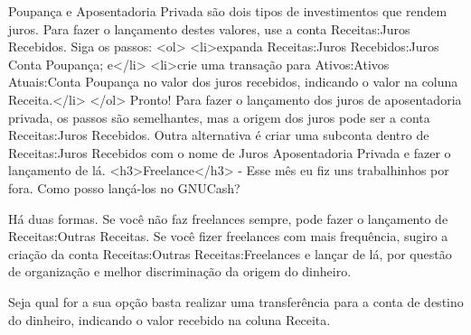 Poupança e Aposentadoria Privada são dois tipos de investimentos que rendem juros. Para fazer o lançamento destes valores, use a conta Receitas:Juros Recebidos. Siga os passos:
<ol>
    <li>expanda Receitas:Juros Recebidos:Juros Conta Poupança; e</li>
    <li>crie uma transação para Ativos:Ativos Atuais:Conta Poupança no valor dos juros recebidos, indicando o valor na coluna Receita.</li>
</ol>
Pronto! Para fazer o lançamento dos juros de aposentadoria privada, os passos são semelhantes, mas a origem dos juros pode ser a conta Receitas:Juros Recebidos. Outra alternativa é criar uma subconta dentro de Receitas:Juros Recebidos com o nome de Juros Aposentadoria Privada e fazer o lançamento de lá.
<h3>Freelance</h3>
- Esse mês eu fiz uns trabalhinhos por fora. Como posso lançá-los no GNUCash?

Há duas formas. Se você não faz freelances sempre, pode fazer o lançamento de Receitas:Outras Receitas. Se você fizer freelances com mais frequência, sugiro a criação da conta Receitas:Outras Receitas:Freelances e lançar de lá, por questão de organização e melhor discriminação da origem do dinheiro.

Seja qual for a sua opção basta realizar uma transferência para a conta de destino do dinheiro, indicando o valor recebido na coluna Receita.
